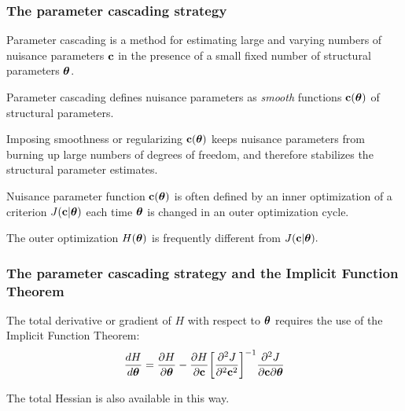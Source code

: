 \documentclass[11pt]{beamer}
\begin{document}

\begin{frame}

\frametitle{The parameter cascading strategy}

\bi
  \item Parameter cascading is a method for estimating large and varying numbers of nuisance parameters $\mbox{\bf c}$ in the presence of a small fixed number of structural parameters $\mbox{\boldmath${\theta}$}$.
  \item Parameter cascading defines nuisance parameters as \emph{smooth} functions $\mbox{\bf c}(\mbox{\boldmath${\theta}$})$ of structural parameters.
  \item Imposing smoothness or regularizing $\mbox{\bf c}(\mbox{\boldmath${\theta}$})$ keeps nuisance parameters from burning up large numbers of degrees of freedom, and therefore stabilizes the structural parameter estimates.
  \item Nuisance parameter function $\mbox{\bf c}(\mbox{\boldmath${\theta}$})$ is often defined by an inner optimization of a criterion $J(\mbox{\bf c}|\mbox{\boldmath${\theta}$})$ each time $\mbox{\boldmath${\theta}$}$ is changed in an outer optimization cycle.
  \item The outer optimization $H(\mbox{\boldmath${\theta}$})$ is frequently different from $J(\mbox{\bf c}|\mbox{\boldmath${\theta}$}).$
\ei

\end{frame}


\begin{frame}

\frametitle{The parameter cascading strategy and the Implicit Function Theorem}

\bi
  \item The total derivative or gradient of $H$ with respect to $\mbox{\boldmath${\theta}$}$ requires the use of the Implicit Function Theorem:
    \[
        \frac{dH}{d \mbox{\boldmath${\theta}$}} = \frac{\partial H}{\partial \mbox{\boldmath${\theta}$}} -
        \frac{\partial H}{\partial \mbox{\bf c}} \bigg[\frac{\partial^2 J}{\partial^2 \mbox{\bf c}^2}\bigg]^{-1}
        \frac{\partial^2 J}{\partial \mbox{\bf c} \partial \mbox{\boldmath${\theta}$}}
    \]
  \item The total Hessian is also available in this way.
\ei

\end{frame}

\end{document}
